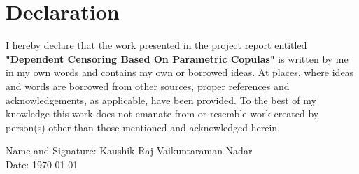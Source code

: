 \section*{Declaration}

\normalsize{
I hereby declare that the work presented in the project report entitled \textbf{"Dependent Censoring Based On Parametric Copulas"} is written by me in my own words and contains my own or borrowed ideas. At places, where ideas
and words are borrowed from other sources, proper references and acknowledgements, as applicable,
have been provided. To the best of my knowledge this work does not emanate from or resemble work
created by person(s) other than those mentioned and acknowledged herein.
}
\vspace{1cm}
\begin{flushleft}
Name and Signature: Kaushik Raj Vaikuntaraman Nadar\\
Date: \today 
\end{flushleft}